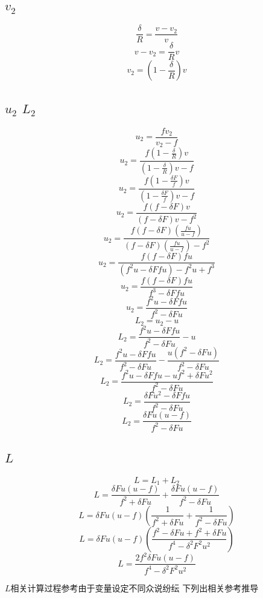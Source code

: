 \documentclass[12pt]{ctexart}
\begin{document}
\subsection[v2]{\(v_2\)}
\[\frac{\delta}{R}=\frac{v-v_2}{v}\]
\[v-v_2=\frac{\delta}{R}v\]
\[v_2=(1-\frac{\delta}{R})v\]

\subsection[u2 L2]{\(u_2\) \(L_2\)}
\[u_2=\frac{fv_2}{v_2-f}\]
\[u_2=\frac{f(1-\frac{\delta}{R})v}{(1-\frac{\delta}{R})v-f}\]
\[u_2=\frac{f(1-\frac{\delta F}{f})v}{(1-\frac{\delta F}{f})v-f}\]
\[u_2=\frac{f(f-\delta F)v}{(f-\delta F)v-f^2}\]
\[u_2=\frac{f(f-\delta F)(\frac{fu}{u-f})}{(f-\delta F)(\frac{fu}{u-f})-f^2}\]
\[u_2=\frac{f(f-\delta F)fu}{(f^2u-\delta Ffu)-f^2u+f^3}\]
\[u_2=\frac{f(f-\delta F)fu}{f^3-\delta Ffu}\]
\[u_2=\frac{f^2u-\delta Ffu}{f^2-\delta Fu}\]
\[L_2=u_2-u\]
\[L_2=\frac{f^2u-\delta Ffu}{f^2-\delta Fu}-u\]
\[L_2=\frac{f^2u-\delta Ffu}{f^2-\delta Fu}-\frac{u(f^2-\delta Fu)}{f^2-\delta Fu}\]
\[L_2=\frac{f^2u-\delta Ffu-uf^2+\delta Fu^2}{f^2-\delta Fu}\]
\[L_2=\frac{\delta Fu^2-\delta Ffu}{f^2-\delta Fu}\]
\[L_2=\frac{\delta Fu(u-f)}{f^2-\delta Fu}\]

\subsection[L]{\(L\)}
\[L=L_1+L_2\]
\[L=\frac{\delta Fu(u-f)}{f^2+\delta Fu}+\frac{\delta Fu(u-f)}{f^2-\delta Fu}\]
\[L=\delta Fu(u-f)(\frac{1}{f^2+\delta Fu}+\frac{1}{f^2-\delta Fu})\]
\[L=\delta Fu(u-f)(\frac{f^2-\delta Fu+f^2+\delta Fu}{f^4-\delta^2 F^2u^2})\]
\[L=\frac{2f^2\delta Fu(u-f)}{f^4-\delta^2 F^2u^2}\]

\(L\)相关计算过程参考由于变量设定不同众说纷纭
下列出相关参考推导\cite{zhihuDof}\cite{Dofref2}


\end{document}
